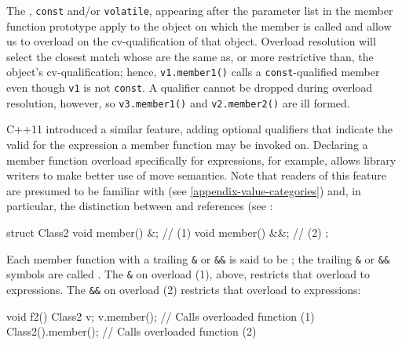 \noindent The , \lstinline!const! and/or \lstinline!volatile!,
appearing after the parameter list in the member function prototype
apply to the object on which the member is called and allow us to
overload on the cv-qualification of that object. Overload resolution
will select the closest match whose  are the same
as, or more restrictive than, the object's cv-qualification; hence,
\lstinline!v1.member1()! calls a \lstinline!const!-qualified member even
though \lstinline!v1! is not \lstinline!const!. A qualifier cannot be dropped
during overload resolution, however, so \lstinline!v3.member1()! and
\lstinline!v2.member2()! are ill formed.

C++11 introduced a similar feature, adding optional qualifiers that
indicate the valid  for the expression a member
function may be invoked on. Declaring a member function overload
specifically for  expressions, for example, allows library
writers to make better use of move semantics. Note that readers of this
feature are presumed to be familiar with  (see \ref{appendix-value-categories}) and, in
particular, the distinction between  and 
references (see :

\begin{emcppslisting}[emcppsbatch=e1]
struct Class2
{
    void member() &;   // (1)
    void member() &&;  // (2)
};
\end{emcppslisting}
    

\noindent Each member function with a trailing \lstinline!&! or \lstinline!&&! is
said to be ; the trailing \lstinline!&! or
\lstinline!&&! symbols are called . The
\lstinline!&!  on overload (1), above, restricts
that overload to  expressions. The \lstinline!&&!
 on overload (2) restricts that overload to
 expressions:

\begin{emcppslisting}[emcppsbatch=e1]
void f2()
{
    Class2 v;
    v.member();         // Calls overloaded function (1)
    Class2().member();  // Calls overloaded function (2)
}
\end{emcppslisting}
    

